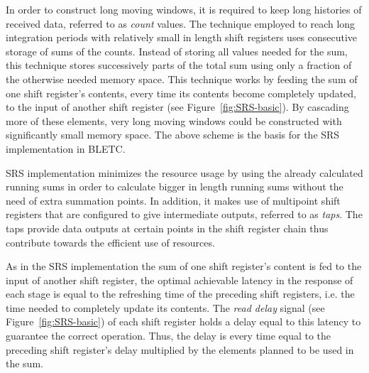 \documentclass{llncs}
\begin{document}
In order to construct long moving windows, it is required to keep long histories of received data, referred to as \emph{count} values. The technique employed to reach long integration periods with relatively small in length shift registers uses consecutive storage of sums of the counts. Instead of storing all values needed for the sum, this technique stores successively parts of the total sum using only a fraction of the otherwise needed memory space. This technique works by feeding the sum of one shift register's contents, every time its contents become completely updated, to the input of another shift register (see Figure~\ref{fig:SRS-basic}). By cascading more of these elements, very long moving windows could be constructed with significantly small memory space. The above scheme is the basis for the SRS implementation in BLETC.

SRS implementation minimizes the resource usage by using the already calculated running sums in order to calculate bigger in length running sums without the need of extra summation points. In addition, it makes use of multipoint shift registers that are configured to give intermediate outputs, referred to as \emph{taps}. The taps provide data outputs at certain points in the shift register chain thus contribute towards the efficient use of resources.

As in the SRS implementation the sum of one shift register's content is fed to the input of another shift register, the optimal achievable latency in the response of each stage is equal to the refreshing time of the preceding shift registers, i.e. the time needed to completely update its contents.  The \emph{read delay} signal (see Figure~\ref{fig:SRS-basic}) of each shift register holds a delay equal to this latency to guarantee the correct operation. Thus, the delay is every time equal to the preceding shift register's delay multiplied by the elements planned to be used in the sum.
\end{document}
